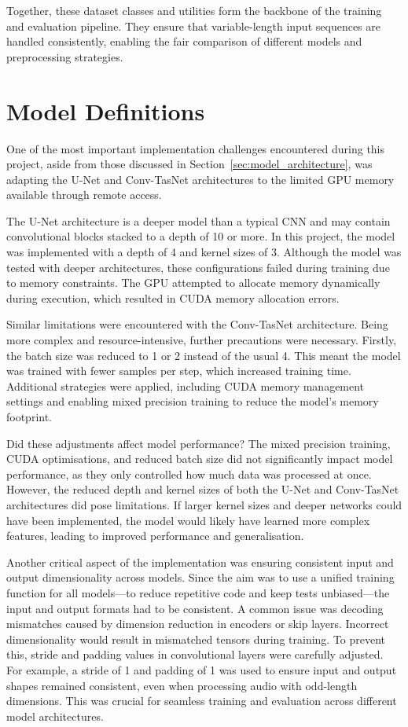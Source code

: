 Together, these dataset classes and utilities form the backbone of the training and evaluation pipeline. They ensure that variable-length input sequences are handled consistently, enabling the fair comparison of different models and preprocessing strategies.

\section{Model Definitions}
\label{sec:model_definitions}

One of the most important implementation challenges encountered during this project, aside from those discussed in Section~\ref{sec:model_architecture}, was adapting the U-Net and Conv-TasNet architectures to the limited GPU memory available through remote access.

The U-Net architecture is a deeper model than a typical CNN and may contain convolutional blocks stacked to a depth of 10 or more. In this project, the model was implemented with a depth of 4 and kernel sizes of 3. Although the model was tested with deeper architectures, these configurations failed during training due to memory constraints. The GPU attempted to allocate memory dynamically during execution, which resulted in CUDA memory allocation errors.

Similar limitations were encountered with the Conv-TasNet architecture. Being more complex and resource-intensive, further precautions were necessary. Firstly, the batch size was reduced to 1 or 2 instead of the usual 4. This meant the model was trained with fewer samples per step, which increased training time. Additional strategies were applied, including CUDA memory management settings and enabling mixed precision training to reduce the model's memory footprint.

Did these adjustments affect model performance? The mixed precision training, CUDA optimisations, and reduced batch size did not significantly impact model performance, as they only controlled how much data was processed at once. However, the reduced depth and kernel sizes of both the U-Net and Conv-TasNet architectures did pose limitations. If larger kernel sizes and deeper networks could have been implemented, the model would likely have learned more complex features, leading to improved performance and generalisation.

Another critical aspect of the implementation was ensuring consistent input and output dimensionality across models. Since the aim was to use a unified training function for all models—to reduce repetitive code and keep tests unbiased—the input and output formats had to be consistent. A common issue was decoding mismatches caused by dimension reduction in encoders or skip layers. Incorrect dimensionality would result in mismatched tensors during training. To prevent this, stride and padding values in convolutional layers were carefully adjusted. For example, a stride of 1 and padding of 1 was used to ensure input and output shapes remained consistent, even when processing audio with odd-length dimensions. This was crucial for seamless training and evaluation across different model architectures.

